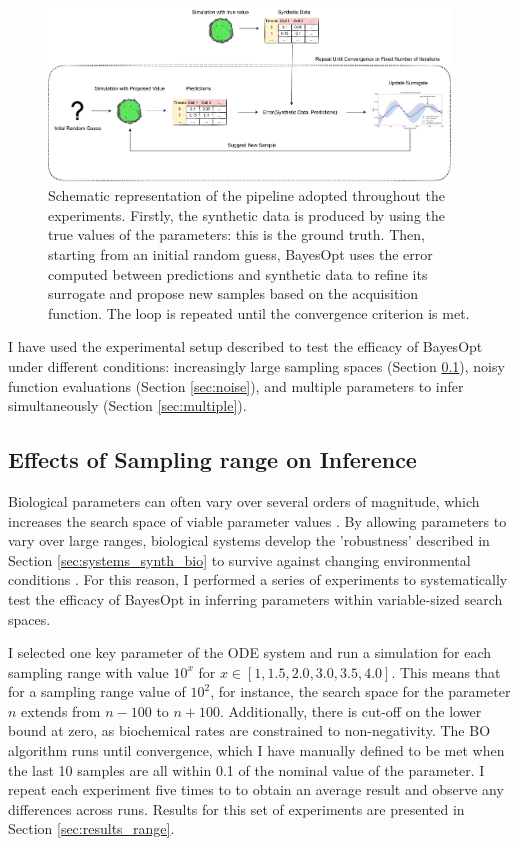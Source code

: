 \documentclass[bsc,frontabs,singlespacing,parskip,deptreport]{infthesis}
\begin{document}
\begin{figure}[h]
    \centering
    \includegraphics[width=0.95\textwidth]{Images/Other/Pipeline.pdf}
    \caption{Schematic representation of the pipeline adopted throughout the experiments. Firstly, the synthetic data is produced by using the true values of the parameters: this is the ground truth. Then, starting from an initial random guess, BayesOpt uses the error computed between predictions and synthetic data to refine its surrogate and propose new samples based on the acquisition function. The loop is repeated until the convergence criterion is met.}
    \label{fig:pipeline}
\end{figure}

I have used the experimental setup described to test the efficacy of BayesOpt under different conditions: increasingly large sampling spaces (Section \ref{sec:sampling_range}), noisy function evaluations (Section \ref{sec:noise}), and multiple parameters to infer simultaneously (Section \ref{sec:multiple}).

\subsection{Effects of Sampling range on Inference}\label{sec:sampling_range}

Biological parameters can often vary over several orders of magnitude, which increases the search space of viable parameter values \cite{pmid15369668}. By allowing parameters to vary over large ranges, biological systems develop the 'robustness' described in Section \ref{sec:systems_synth_bio} to survive against changing environmental conditions \cite{pmid21920040}. For this reason, I performed a series of experiments to systematically test the efficacy of BayesOpt in inferring parameters within variable-sized search spaces. 

I selected one key parameter of the ODE system and run a simulation for each sampling range with value $10^{x}$ for $x \in [1, 1.5, 2.0, 3.0, 3.5, 4.0]$. This means that for a sampling range value of $10^2$, for instance, the search space for the parameter $n$ extends from $n-100$ to $n+100$. Additionally, there is cut-off on the lower bound at zero, as biochemical rates are constrained to non-negativity. The BO algorithm runs until convergence, which I have manually defined to be met when the last 10 samples are all within 0.1 of the nominal value of the parameter. I repeat each experiment five times to to obtain an average result and observe any differences across runs. Results for this set of experiments are presented in Section \ref{sec:results_range}.
\end{document}
